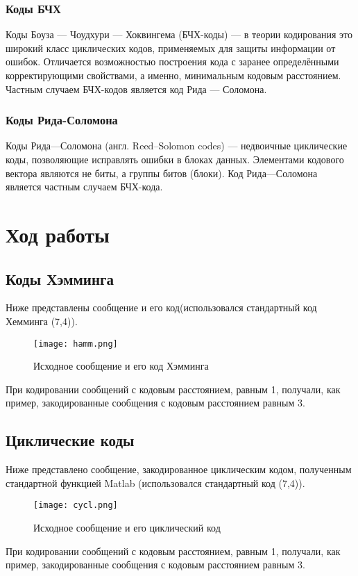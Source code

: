 \subsubsection{Коды БЧХ}
Коды Боуза — Чоудхури — Хоквингема (БЧХ-коды) — в теории кодирования это широкий класс циклических кодов, применяемых для защиты информации от ошибок. Отличается возможностью построения кода с заранее определёнными корректирующими свойствами, а именно, минимальным кодовым расстоянием. Частным случаем БЧХ-кодов является код Рида — Соломона.

\subsubsection{Коды Рида-Соломона}
Коды Рида—Соломона (англ. Reed–Solomon codes) — недвоичные циклические коды, позволяющие исправлять ошибки в блоках данных. Элементами кодового вектора являются не биты, а группы битов (блоки).
Код Рида—Соломона является частным случаем БЧХ-кода.

\section{Ход работы}

\subsection{Коды Хэмминга}
Ниже представлены сообщение и его код(использовался стандартный код Хемминга (7,4)).
\begin{figure}[H]
    \begin{center}
        \texttt{[image: hamm.png]}
        \caption{Исходное сообщение и его код Хэмминга} %
        \label{Ham_Code} %
    \end{center}
\end{figure}
При кодировании сообщений с кодовым расстоянием, равным 1, получали, как пример, закодированные сообщения с кодовым расстоянием равным 3.

\subsection{Циклические коды}
Ниже представлено сообщение, закодированное циклическим кодом, полученным стандартной функцией  Matlab (использовался стандартный код (7,4)).
\begin{figure}[H]
    \begin{center}
        \texttt{[image: cycl.png]}
        \caption{Исходное сообщение и его циклический код} %
        \label{Cyclic_Code} %
    \end{center}
\end{figure}
При кодировании сообщений с кодовым расстоянием, равным 1, получали, как пример, закодированные сообщения с кодовым расстоянием равным 3.

